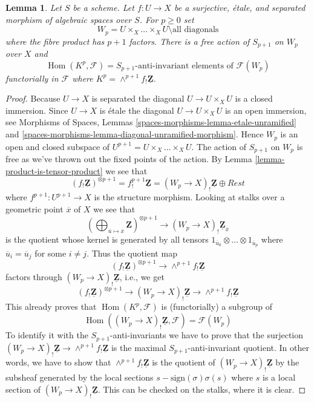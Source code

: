 \documentclass{stacks-project}
\theoremstyle{plain}
\newtheorem{lemma}[subsection]{Lemma}
\theoremstyle{definition}
\theoremstyle{remark}
\numberwithin{equation}{subsection}
\def\Hom{\mathop{\mathrm{Hom}}\nolimits}
\begin{document}
\begin{lemma}
\label{lemma-compute}
Let $S$ be a scheme. Let $f : U \to X$ be a surjective, \'etale, and separated
morphism of algebraic spaces over $S$. For $p \geq 0$ set
$$
W_p = U \times_X \ldots \times_X U \setminus \text{all diagonals}
$$
where the fibre product has $p + 1$ factors.
There is a free action of $S_{p + 1}$ on $W_p$ over $X$ and
$$
\Hom(K^p, \mathcal{F}) = S_{p + 1}\text{-anti-invariant elements of }
\mathcal{F}(W_p)
$$
functorially in $\mathcal{F}$ where
$K^p = \wedge^{p + 1}f_!\underline{\mathbf{Z}}$.
\end{lemma}

\begin{proof}
Because $U \to X$ is separated the diagonal $U \to U \times_X U$ is a
closed immersion. Since $U \to X$ is \'etale the diagonal
$U \to U \times_X U$ is an open immersion, see
Morphisms of Spaces, Lemmas
\ref{spaces-morphisms-lemma-etale-unramified} and
\ref{spaces-morphisms-lemma-diagonal-unramified-morphism}.
Hence $W_p$ is an open and closed subspace of
$U^{p + 1} = U \times_X \ldots \times_X U$. The action of $S_{p + 1}$
on $W_p$ is free as we've thrown out the fixed points of the action.
By
Lemma \ref{lemma-product-is-tensor-product}
we see that
$$
(f_!\underline{\mathbf{Z}})^{\otimes p + 1} =
f^{p + 1}_!\underline{\mathbf{Z}} = (W_p \to X)_!\underline{\mathbf{Z}}
\oplus Rest
$$
where $f^{p + 1} : U^{p + 1} \to X$ is the structure morphism.
Looking at stalks over a geometric point $\overline{x}$ of $X$
we see that
$$
\left(
\bigoplus\nolimits_{\overline{u} \mapsto \overline{x}} \mathbf{Z}
\right)^{\otimes p + 1}
\longrightarrow
(W_p \to X)_!\underline{\mathbf{Z}}_{\overline{x}}
$$
is the quotient whose kernel is generated by all tensors
$1_{\overline{u}_0} \otimes \ldots \otimes 1_{\overline{u}_p}$
where $\overline{u}_i = \overline{u}_j$ for some $i \not = j$.
Thus the quotient map
$$
(f_!\underline{\mathbf{Z}})^{\otimes p + 1}
\longrightarrow
\wedge^{p + 1}f_!\underline{\mathbf{Z}}
$$
factors through $(W_p \to X)_!\underline{\mathbf{Z}}$, i.e., we get
$$
(f_!\underline{\mathbf{Z}})^{\otimes p + 1}
\longrightarrow
(W_p \to X)_!\underline{\mathbf{Z}}
\longrightarrow
\wedge^{p + 1}f_!\underline{\mathbf{Z}}
$$
This already proves that $\Hom(K^p, \mathcal{F})$ is (functorially) a
subgroup of
$$
\Hom((W_p \to X)_!\underline{\mathbf{Z}}, \mathcal{F}) = \mathcal{F}(W_p)
$$
To identify it with the $S_{p + 1}$-anti-invariants we have to prove that
the surjection $(W_p \to X)_!\underline{\mathbf{Z}}
\to \wedge^{p + 1}f_!\underline{\mathbf{Z}}$ is the maximal
$S_{p + 1}$-anti-invariant quotient. In other words, we have to show that
$\wedge^{p + 1}f_!\underline{\mathbf{Z}}$ is the quotient of
$(W_p \to X)_!\underline{\mathbf{Z}}$ by the subsheaf generated by
the local sections $s - \text{sign}(\sigma)\sigma(s)$ where $s$ is
a local section of $(W_p \to X)_!\underline{\mathbf{Z}}$.
This can be checked on the stalks, where it is clear.
\end{proof}
\end{document}
